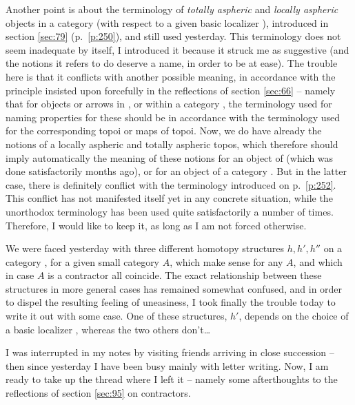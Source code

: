 Another point is about the terminology of \emph{totally aspheric} and
\emph{locally aspheric} objects in a category \Ahat{} (with respect to
a given basic localizer \scrW), introduced in section \ref{sec:79}
(p.\ \ref{p:250}), and still used yesterday. This terminology does not
seem inadequate by itself, I introduced it because it struck me as
suggestive (and the notions it refers to do deserve a name, in order
to be at ease). The trouble here is that it conflicts with another
possible meaning, in accordance with the principle insisted upon
forcefully in the reflections of section \ref{sec:66} -- namely that
for objects or arrows in \Cat, or within a category \Ahat, the
terminology used for naming properties for these should be in
accordance with the terminology used for the corresponding topoi or
maps of topoi. Now, we do have already the notions of a locally
aspheric and totally aspheric topos, which therefore should imply
automatically the meaning of these notions for an object of \Cat{}
(which was done satisfactorily months ago), or for an object of a
category \Ahat. But in the latter case, there is definitely conflict
with the terminology introduced on p.\ \ref{p:252}. This conflict has
not manifested itself yet in any concrete situation, while the
unorthodox terminology has been used quite satisfactorily a number of
times. Therefore, I would like to keep it, as long as I am not forced
otherwise.

\starsbreak

We were faced yesterday with three different homotopy
structures $h,h',h''$ on a category \Ahat, for a given small category
$A$, which make sense for any $A$, and which in case $A$ is a
contractor all coincide. The exact relationship between these
structures in more general cases has remained somewhat confused, and
in order to dispel the resulting feeling of uneasiness, I took finally
the trouble today to write it out with some case. One of these
structures, $h'$, depends on the choice of a basic localizer \scrW,
whereas the two others don't\ldots

\bigbreak
\presectionfill{}\par

\label{sec:97}%
I was interrupted in my notes by visiting friends arriving in close
succession -- then since yesterday I have been busy mainly with letter
writing. Now, I am ready to take up the thread where I left it --
namely some afterthoughts to the reflections of section \ref{sec:95}
on contractors.

